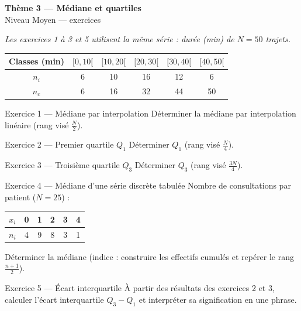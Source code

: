 \documentclass[11pt,a4paper]{article}
\newcommand{\bandeau}[2]{%
\begin{tcolorbox}[boxbase,colback=primary,colframe=primarydark,halign=center,
   before skip=2pt,after skip=12pt]
{\LARGE\bfseries\color{white} #1}\\[3pt]{\normalsize\color{white} #2}
\end{tcolorbox}}
\begin{document}
\bandeau{Thème 3 — Médiane et quartiles}{Niveau Moyen — exercices}

\noindent\textit{Les exercices 1 à 3 et 5 utilisent la même série : durée (min) de $N=50$ trajets.}
\begin{center}
\renewcommand{\arraystretch}{1.15}
\begin{tabular}{|c|c|c|c|c|c|}
\hline
Classes (min) & $[0,10[$ & $[10,20[$ & $[20,30[$ & $[30,40[$ & $[40,50[$ \\\hline
$n_i$ & 6 & 10 & 16 & 12 & 6 \\\hline
$n_c$ & 6 & 16 & 32 & 44 & 50 \\\hline
\end{tabular}
\end{center}

\begin{exobox}{Exercice 1 — Médiane par interpolation}
Déterminer la médiane par interpolation linéaire (rang visé $\tfrac{N}{2}$).
\end{exobox}

\begin{exobox}{Exercice 2 — Premier quartile $Q_1$}
Déterminer $Q_1$ (rang visé $\tfrac{N}{4}$).
\end{exobox}

\begin{exobox}{Exercice 3 — Troisième quartile $Q_3$}
Déterminer $Q_3$ (rang visé $\tfrac{3N}{4}$).
\end{exobox}

\begin{exobox}{Exercice 4 — Médiane d'une série discrète tabulée}
Nombre de consultations par patient ($N=25$) :
\begin{center}
\begin{tabular}{|c|c|c|c|c|c|}
\hline
$x_i$ & 0 & 1 & 2 & 3 & 4 \\\hline
$n_i$ & 4 & 9 & 8 & 3 & 1 \\\hline
\end{tabular}
\end{center}
Déterminer la médiane (indice : construire les effectifs cumulés et repérer le rang $\tfrac{n+1}{2}$).
\end{exobox}

\begin{exobox}{Exercice 5 — Écart interquartile}
À partir des résultats des exercices 2 et 3, calculer l'écart interquartile $Q_3-Q_1$ et interpréter
sa signification en une phrase.
\end{exobox}
\end{document}
